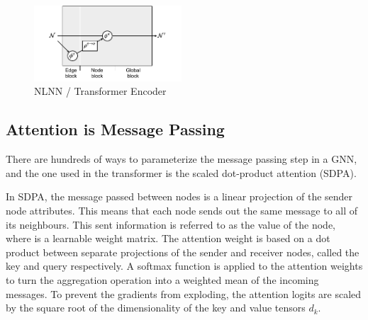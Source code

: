 \begin{figure}
    \centering
    \includegraphics[width=0.49\textwidth]{Figures/transformers/nonlocal.pdf}
    \caption{NLNN / Transformer Encoder}
    \label{fig:transformer}
\end{figure}

\subsection{Attention is Message Passing}
\label{sec:attention}

There are hundreds of ways to parameterize the message passing step in a GNN, and the one used in the transformer is the scaled dot-product attention (SDPA).

In SDPA, the message passed between nodes is a linear projection of the sender node attributes.
This means that each node sends out the same message to all of its neighbours.
This sent information is referred to as the value of the node, where is a learnable weight matrix.
The attention weight is based on a dot product between separate projections of the sender and receiver nodes, called the key and query respectively.
A softmax function is applied to the attention weights to turn the aggregation operation into a weighted mean of the incoming messages.
To prevent the gradients from exploding, the attention logits are scaled by the square root of the dimensionality of the key and value tensors $d_k$.

